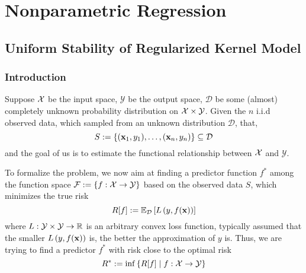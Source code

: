 \chapter{Nonparametric Regression}

\section{Uniform Stability of Regularized Kernel Model}

\subsection{Introduction}

Suppose \(\mathcal{X}\) be the input space, \(\mathcal{Y}\) be the output space, \(\mathcal{D}\) be some (almost) completely unknown probability distribution on \(\mathcal{X}\times\mathcal{Y}\). Given the \(n\) i.i.d observed data, which sampled from an unknown distribution \(\mathcal{D}\), that,
\begin{equation}
	S:=\left\{(\mathbf{x}_{1},y_{1}),\ldots,(\mathbf{x}_{n},y_{n})\right\}\subseteq\mathcal{D}
\end{equation}
and the goal of us is to estimate the functional relationship between \(\mathcal{X}\) and \(\mathcal{Y}\).

To formalize the problem, we now aim at finding a predictor function \(f^{*}\) among the function space \(\mathcal{F}:=\left\{f:\mathcal{X}\rightarrow\mathcal{Y}\right\}\) based on the observed data \(S\), which minimizes the true risk
\begin{equation} \label{eq:true-risk}
	R[f]:=\mathbb{E}_{\mathcal{D}}\left[L\left(y,f(\mathbf{x})\right)\right]
\end{equation}
where \(L:\mathcal{Y}\times\mathcal{Y}\rightarrow\mathbb{R}\) is an arbitrary convex loss function, typically assumed that the smaller \(L\left(y,f(\mathbf{x})\right)\) is, the better the approximation of \(y\) is. Thus, we are trying to find a predictor \(f^{*}\) with risk close to the optimal risk
\begin{equation}
	R^{*}:=\inf\left\{R[f]\mid f:\mathcal{X}\rightarrow\mathcal{Y}\right\}
\end{equation}

